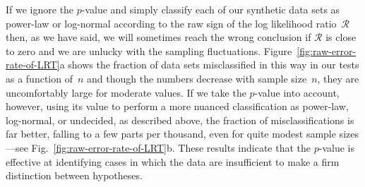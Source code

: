 \documentclass[final]{siamltex}
\begin{document}
If we ignore the $p$-value and simply classify each of our synthetic data
sets as power-law or log-normal according to the raw sign of the log
likelihood ratio~$\mathcal{R}$ then, as we have said, we will sometimes
reach the wrong conclusion if $\mathcal{R}$ is close to zero and we are
unlucky with the sampling fluctuations.
Figure~\ref{fig:raw-error-rate-of-LRT}a shows the fraction of data sets
misclassified in this way in our tests as a function of~$n$ and though the
numbers decrease with sample size~$n$, they are uncomfortably large for
moderate values.  If we take the $p$-value into account, however, using its
value to perform a more nuanced classification as power-law, log-normal, or
undecided, as described above, the fraction of misclassifications is far
better, falling to a few parts per thousand, even for quite modest sample
sizes---see Fig.~\ref{fig:raw-error-rate-of-LRT}b.  These results indicate
that the $p$-value is effective at identifying cases in which the data are
insufficient to make a firm distinction between hypotheses.


\end{document}
